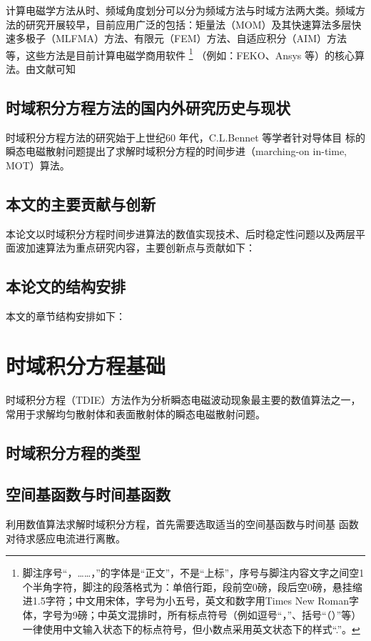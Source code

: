 \documentclass[master]{thesis-uestc}
\begin{document}
计算电磁学方法从时、频域角度划分可以分为频域方法与时域方法两大类。频域方法的研究开展较早，目前应用广泛的包括：矩量法（MOM）及其快速算法多层快速多极子（MLFMA）方法、有限元（FEM）方法、自适应积分（AIM）方法等，这些方法是目前计算电磁学商用软件
\footnote{脚注序号“，……，”的字体是“正文”，不是“上标”，序号与脚注内容文字之间空1个半角字符，脚注的段落格式为：单倍行距，段前空0磅，段后空0磅，悬挂缩进1.5字符；中文用宋体，字号为小五号，英文和数字用Times New Roman字体，字号为9磅；中英文混排时，所有标点符号（例如逗号“，”、括号“（）”等）一律使用中文输入状态下的标点符号，但小数点采用英文状态下的样式“.”。}
（例如：FEKO、Ansys 等）的核心算法。由文献\cite{feng997he,clerc2010discrete,xiao2012yi}可知

\section{时域积分方程方法的国内外研究历史与现状}
时域积分方程方法的研究始于上世纪60 年代，C.L.Bennet 等学者针对导体目
标的瞬态电磁散射问题提出了求解时域积分方程的时间步进（marching-on in-time,
MOT）算法。

\section{本文的主要贡献与创新}
本论文以时域积分方程时间步进算法的数值实现技术、后时稳定性问题以及两层平面波加速算法为重点研究内容，主要创新点与贡献如下：

\section{本论文的结构安排}
本文的章节结构安排如下：


\chapter{时域积分方程基础}
时域积分方程（TDIE）方法作为分析瞬态电磁波动现象最主要的数值算法之一，常用于求解均匀散射体和表面散射体的瞬态电磁散射问题。

\section{时域积分方程的类型}

\section{空间基函数与时间基函数}
利用数值算法求解时域积分方程，首先需要选取适当的空间基函数与时间基
函数对待求感应电流进行离散。
\end{document}
